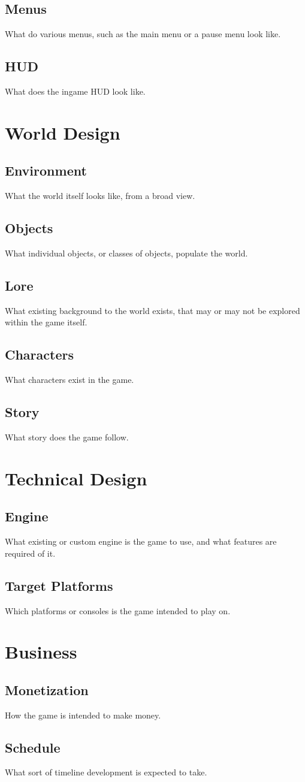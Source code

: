 \subsection{Menus}
What do various menus, such as the main menu or a pause menu look like.
\subsection{HUD}
What does the ingame HUD look like.

\section{World Design}
\subsection{Environment}
What the world itself looks like, from a broad view.
\subsection{Objects}
What individual objects, or classes of objects, populate the world.
\subsection{Lore}
What existing background to the world exists, that may or may not be explored within the game itself.
\subsection{Characters}
What characters exist in the game.
\subsection{Story}
What story does the game follow.

\section{Technical Design}
\subsection{Engine}
What existing or custom engine is the game to use, and what features are required of it.
\subsection{Target Platforms}
Which platforms or consoles is the game intended to play on.

\section{Business}
\subsection{Monetization}
How the game is intended to make money.
\subsection{Schedule}
What sort of timeline development is expected to take.

